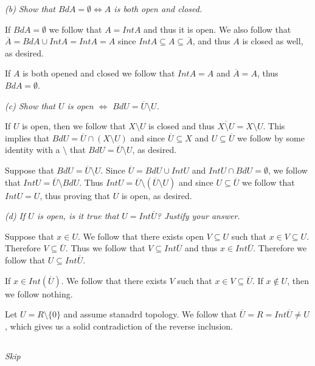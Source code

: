 \documentclass[11pt,oneside,titlepage]{book}
\DeclareMathOperator \lra {\Leftrightarrow}
\newcommand{\set}[1]{\{ #1 \}}
\begin{document}
\textit{(b) Show that $Bd A = \emptyset \lra A $ is both open and closed.}

If $Bd A = \emptyset$ we follow that $A = Int A$ and thus it is open.
We also follow that $\overline{A} = Bd A \cup Int A = Int A = A$
since $Int A \subseteq A \subseteq \overline{A}$, and thus $A$ is closed as well,
as desired.

If $A$ is both opened and closed we follow that $Int A = A$ and $\overline{A} = A$,
thus $Bd A = \emptyset$. 

\textit{(c) Show that $U$ is open $\lra$ $Bd U = \overline{U} \setminus U$.}

If $U$ is open, then we follow that $X \setminus U$ is closed and thus
$\overline{X \setminus U } = X \setminus U$. This implies that
$Bd U = \overline{U} \cap (X \setminus U)$ and since $\overline{U} \subseteq X$
and $U \subseteq \overline{U}$ we follow by some identity with a $\setminus$ that 
$Bd U = \overline{U} \setminus U$, as desired.

Suppose that $Bd U = \overline{U} \setminus U$. 
Since $\overline{U} = Bd U \cup Int U$ and $Int U \cap Bd U = \emptyset$, we follow that
$Int U = \overline{U} \setminus Bd U$. Thus
$Int U = \overline{U} \setminus (\overline{U} \setminus U)$ and since $U \subseteq \overline{U}$
we follow that
$Int U = U$, thus proving that $U$ is open, as desired.

\textit{(d) If $U$ is open, is it true that $U = Int \overline{U}$? Justify
  your answer.}

Suppose that $x \in U$. We follow that there exists open $V \subseteq U$
such that $x \in V \subseteq U$. Therefore $V \subseteq \overline{U}$.
Thus we follow that $V \subseteq Int \overline{U}$ and thus $x \in Int \overline{U}$.
Therefore we follow that $U \subseteq Int \overline{U}$. 

If $x \in Int(\overline{U})$. We follow that there exists $V$ such that
$x \in V \subseteq \overline{U}$. If $x \notin U$, then we follow nothing.

Let $U = R \setminus \set{0}$ and assume stanadrd topology. We follow that
$\overline{U} = R = Int \overline{U} \neq U$, which gives us a solid contradiction
of the reverse inclusion. 

\subsection{}

\textit{Skip}

\subsection{}
\end{document}

